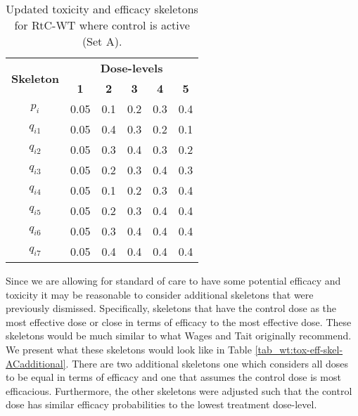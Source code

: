   \begin{table}[!h]
 	\centering
 	\caption[Updated toxicity and efficacy skeletons for RtC-WT (Set A)]{Updated toxicity and efficacy skeletons for RtC-WT where control is active (Set A).}
 	\label{tab_wt:tox-eff-skel-AC}
 	\begin{tabular}{c|ccccc}
 		\hline
 		\multicolumn{1}{c|}{\multirow{2}{*}{\textbf{Skeleton}}} & \multicolumn{5}{c}{\textbf{Dose-levels}}                       \\
 		\multicolumn{1}{c|}{}                                   & \textbf{1} & \textbf{2} & \textbf{3} & \textbf{4} & \textbf{5} \\ \hline
 		$p_i$    & 0.05 & 0.1 & 0.2 & 0.3 & 0.4 \\
 		$q_{i1}$ & 0.05 & 0.4 & 0.3 & 0.2 & 0.1 \\
 		$q_{i2}$ & 0.05 & 0.3 & 0.4 & 0.3 & 0.2 \\
 		$q_{i3}$ & 0.05 & 0.2 & 0.3 & 0.4 & 0.3 \\
 		$q_{i4}$ & 0.05 & 0.1 & 0.2 & 0.3 & 0.4 \\
 		$q_{i5}$ & 0.05 & 0.2 & 0.3 & 0.4 & 0.4 \\
 		$q_{i6}$ & 0.05 & 0.3 & 0.4 & 0.4 & 0.4 \\
 		$q_{i7}$ & 0.05 & 0.4 & 0.4 & 0.4 & 0.4 \\ \hline
 	\end{tabular}
 \end{table}
 
 Since we are allowing for standard of care to have some potential efficacy and toxicity it may be reasonable to consider additional skeletons that were previously dismissed. Specifically, skeletons that have the control dose as the most effective dose or close in terms of efficacy to the most effective dose. These skeletons would be much similar to what Wages and Tait originally recommend. We present what these skeletons would look like in Table \ref{tab_wt:tox-eff-skel-ACadditional}. There are two additional skeletons one which considers all doses to be equal in terms of efficacy and one that assumes the control dose is most efficacious. Furthermore, the other skeletons were adjusted such that the control dose has similar efficacy probabilities to the lowest treatment dose-level. 
 
